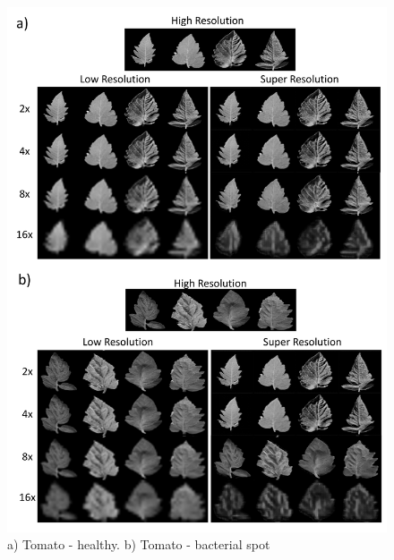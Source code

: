 \documentclass[10pt,twocolumn,letterpaper]{article}
\begin{document}
\begin{figure}[h]
\begin{center}
\includegraphics[scale=0.40]{results/srimages.pdf}
\end{center}
   \caption{a) Tomato - healthy. b) Tomato - bacterial spot} 
\label{fig:srimages}
\end{figure}

\end{document}
